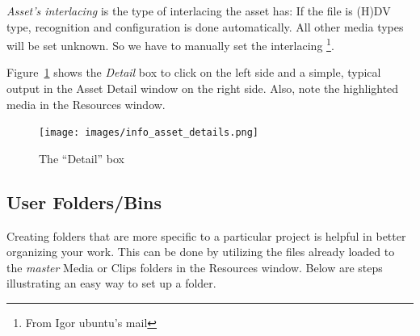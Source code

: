 \textit{Asset's interlacing}  is the type of interlacing the asset has: If the file is (H)DV type, recognition and configuration is done automatically. All other media types will be set unknown. So we have to manually set the interlacing \protect\footnote{From Igor ubuntu's mail}.

Figure~\ref{fig:info_asset_details} shows the \textit{Detail} box to click on the left side and a simple, typical output in the Asset Detail window on the right side.  Also, note the highlighted media in the Resources window.

\begin{figure}[htpb]
    \centering
    \texttt{[image: images/info\_asset\_details.png]}
    \caption{The “Detail” box}
    \label{fig:info_asset_details}
\end{figure}

\subsection{User Folders/Bins}%
\label{sub:user_folders_bins}

Creating folders that are more specific to a particular project is helpful in better organizing your work.  
This can be done by utilizing the files already loaded to the \textit{master} Media or Clips folders in the Resources window.  
Below are steps illustrating an easy way to set up a folder.

